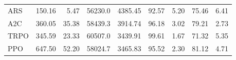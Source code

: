 \begin{samepage}
\begin{center}
\begin{tabular}{l|rr|rr|rr|rr}
    ARS          &   150.16 &     5.47 &    56230.0 &    4385.45 &   92.57 &    5.20 &   75.46 &    6.41 \\
    A2C          &   360.05 &    35.38 &    58439.3 &    3914.74 &   96.18 &    3.02 &   79.21 &    2.73 \\
    TRPO         &   345.59 &    23.33 &    60507.0 &    3439.91 &   99.61 &    1.67 &   71.32 &    5.35 \\
    PPO          &   647.50 &    52.20 &    58024.7 &    3465.83 &   95.52 &    2.30 &   81.12 &    4.71 \\
    \bottomrule
  \end{tabular}
\end{center}
\end{samepage}

